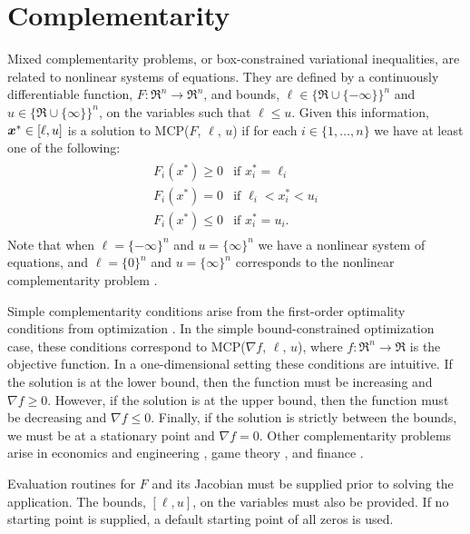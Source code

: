 \section{Complementarity}
\label{sec:complementarity}

Mixed complementarity problems, or box-constrained variational inequalities,
are related to nonlinear systems of equations.  They are defined by a 
continuously differentiable function,
$F:\Re^n \to \Re^n$, and bounds, $\ell \in \{\Re \cup \{-\infty\}\}^n$ 
and $u \in \{\Re \cup \{\infty\}\}^n$, on the variables such that 
$\ell \leq u$.  Given this information, $\mbox{\boldmath \(x\)}^* \in [\ell,u]$ is a solution to 
MCP($F$, $\ell$, $u$) if for each $i \in \{1, \ldots, n\}$ we have at
least one of the following:
\begin{eqnarray*}
\begin{array}{ll}
F_i(x^*) \geq 0 & \mbox{if } x^*_i = \ell_i \\
F_i(x^*) = 0 & \mbox{if } \ell_i < x^*_i < u_i \\
F_i(x^*) \leq 0 & \mbox{if } x^*_i = u_i.
\end{array}
\end{eqnarray*}
Note that when $\ell = \{-\infty\}^n$ and $u = \{\infty\}^n$ we have a 
nonlinear system of equations, and $\ell = \{0\}^n$ and $u = \{\infty\}^n$ 
corresponds to the nonlinear complementarity problem \cite{cottle:nonlinear}.

Simple complementarity conditions arise from the first-order optimality 
conditions from optimization \cite{karush:minima, kuhn.tucker:nonlinear}.  
In the simple bound-constrained optimization case, these conditions 
correspond to MCP($\nabla f$, $\ell$, $u$), where $f: \Re^n \to \Re$ 
is the objective function.  In a one-dimensional setting these conditions 
are intuitive.  If the solution is at the lower bound, then the function must 
be increasing and $\nabla f \geq 0$.  However, if the solution is at the 
upper bound, then the function must be decreasing and $\nabla f \leq 0$.  
Finally, if the solution 
is strictly between the bounds, we must be at a stationary point and 
$\nabla f = 0$.  Other complementarity problems arise in economics and 
engineering \cite{ferris.pang:engineering}, game 
theory \cite{nash:equilibrium}, and finance \cite{huang.pang:option}.

Evaluation routines for $F$ and its Jacobian must be supplied prior
to solving the application.
The bounds, $[\ell,u]$, on the variables must also be 
provided.  
If no starting point is supplied, a default starting point of all zeros 
is used.

